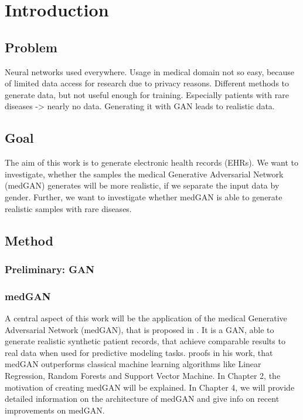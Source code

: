 \documentclass[11pt, a4paper]{book}
\begin{document}





\chapter{Introduction}

\section{Problem}
Neural networks used everywhere. Usage in medical domain not so easy, because of limited data access for research due to privacy reasons.
Different methods to generate data, but not useful enough for training.
Especially patients with rare diseases -> nearly no data. 
Generating it with GAN leads to realistic data.
\section{Goal}
The aim of this work is to generate electronic health records (EHRs). We want to investigate, whether the samples the medical Generative Adversarial Network (medGAN) generates will be more realistic, if we separate the input data by gender. Further, we want to investigate whether medGAN is able to generate realistic samples with rare diseases.
\section{Method}

\subsection{Preliminary: GAN}


\subsection{medGAN}
A central aspect of this work will be the application of the medical Generative Adversarial Network (medGAN), that is proposed in \cite{Choi2017}.
It is a GAN, able to generate realistic synthetic patient records, that achieve comparable results to real data when used for predictive modeling tasks. \cite{Choi2017} proofs in his work, that medGAN outperforms classical machine learning algorithms like Linear Regression, Random Forests and Support Vector Machine. 
In Chapter 2, the motivation of creating medGAN will be explained. In Chapter 4, we will provide detailed information on the architecture of medGAN and give info on recent improvements on medGAN.
\end{document}
